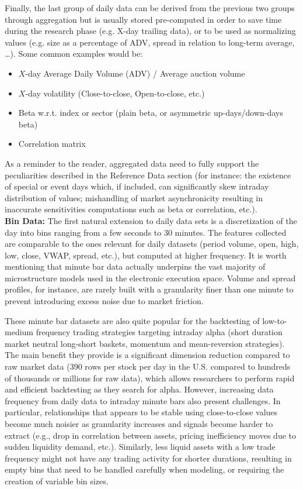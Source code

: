 Finally, the last group of daily data can be derived from the previous two groups through aggregation but is usually stored pre-computed in order to save time during the research phase (e.g. X-day trailing data), or to be used as normalizing values (e.g. size as a percentage of ADV, spread in relation to long-term average, \dots). Some common examples would be:
        \begin{itemize}
        \item $X$-day Average Daily Volume (ADV) / Average auction volume
        \item $X$-day volatility (Close-to-close, Open-to-close, etc.)
        \item Beta w.r.t. index or sector (plain beta, or asymmetric up-days/down-days beta)
        \item Correlation matrix
        \end{itemize}
As a reminder to the reader, aggregated data need to fully support the peculiarities described in the Reference Data section (for instance: the existence of special or event days which, if included, can significantly skew intraday distribution of values; mishandling of market asynchronicity resulting in inaccurate sensitivities computations such as beta or correlation, etc.). \\


\noindent\textbf{Bin Data:} The first natural extension to daily data sets is a discretization of the day into bins ranging from a few seconds to 30 minutes. The features collected are comparable to the ones relevant for daily datasets (period volume, open, high, low, close, VWAP, spread, etc.), but computed at higher frequency. It is worth mentioning that minute bar data actually underpins the vast majority of microstructure models used in the electronic execution space. Volume and spread profiles, for instance, are rarely built with a granularity finer than one minute to prevent introducing excess noise due to market friction.

These minute bar datasets are also quite popular for the backtesting of low-to-medium frequency trading strategies targeting intraday alpha (short duration market neutral long-short baskets, momentum and mean-reversion strategies). The main benefit they provide is a significant dimension reduction compared to raw market data (390 rows per stock per day in the U.S. compared to hundreds of thousands or millions for raw data), which allows researchers to perform rapid and efficient backtesting as they search for alpha. However, increasing data frequency from daily data to intraday minute bars also present challenges. In particular, relationships that appears to be stable using close-to-close values become much noisier as granularity increases and signals become harder to extract (e.g., drop in correlation between assets, pricing inefficiency moves due to sudden liquidity demand, etc.). Similarly, less liquid assets with a low trade frequency might not have any trading activity for shorter durations, resulting in empty bins that need to be handled carefully when modeling, or requiring the creation of variable bin sizes. \\


